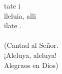 \begin{cancion}%
	tate i\\
	lleluia, alli\\
	ilate .\\
	\jump\\
(Cantad al Señor.\\
¡Aleluya, aleluya!\\
 Alegraos en Dios)\\
\end{cancion}%
